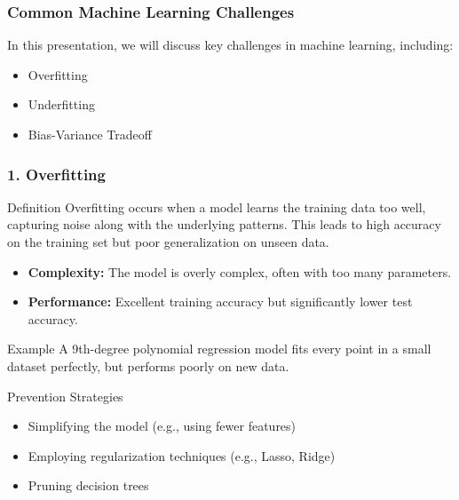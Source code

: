 \documentclass[aspectratio=169]{beamer}
\begin{document}
\begin{frame}[fragile]
  \frametitle{Common Machine Learning Challenges}
  In this presentation, we will discuss key challenges in machine learning, including:
  \begin{itemize}
    \item Overfitting
    \item Underfitting
    \item Bias-Variance Tradeoff
  \end{itemize}
\end{frame}

\begin{frame}[fragile]
  \frametitle{1. Overfitting}

  \begin{block}{Definition}
    Overfitting occurs when a model learns the training data too well, capturing noise along with the underlying patterns. This leads to high accuracy on the training set but poor generalization on unseen data.
  \end{block}

  \begin{itemize}
    \item \textbf{Complexity:} The model is overly complex, often with too many parameters.
    \item \textbf{Performance:} Excellent training accuracy but significantly lower test accuracy.
  \end{itemize}

  \begin{block}{Example}
    A 9th-degree polynomial regression model fits every point in a small dataset perfectly, but performs poorly on new data.
  \end{block}

  \begin{block}{Prevention Strategies}
    \begin{itemize}
      \item Simplifying the model (e.g., using fewer features)
      \item Employing regularization techniques (e.g., Lasso, Ridge)
      \item Pruning decision trees
    \end{itemize}
  \end{block}

\end{frame}
\end{document}
